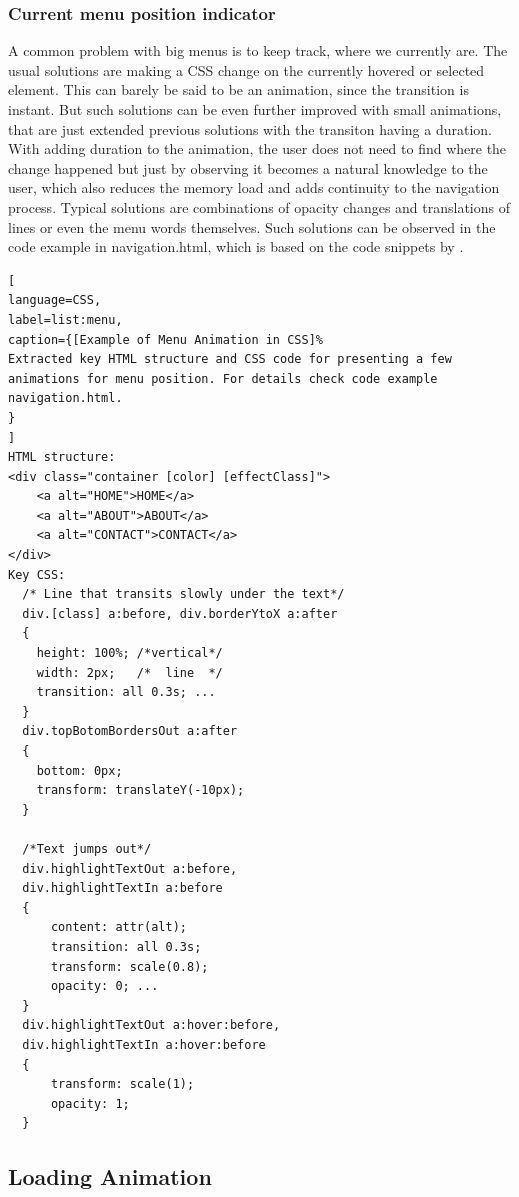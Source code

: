 \subsubsection{Current menu position indicator} %
\label{subsub:menu}

A common problem with big menus is to keep track, where we currently are. The usual solutions are making a CSS change on the currently hovered or selected element. This can barely be said to be an animation, since the transition is instant. But such solutions can be even further improved with small animations, that are just extended previous solutions with the transiton having a duration. With adding duration to the animation, the user does not need to find where the change happened but just by observing it becomes a natural knowledge to the user, which also reduces the memory load and adds continuity to the navigation process. Typical solutions are combinations of opacity changes and translations of lines or even the menu words themselves. Such solutions can be observed in the code example in navigation.html, which is based on the code snippets by \citet{menuIndex}.

\begin{lstlisting}[
language=CSS,
label=list:menu,
caption={[Example of Menu Animation in CSS]%
Extracted key HTML structure and CSS code for presenting a few animations for menu position. For details check code example navigation.html.
}
]
HTML structure:
<div class="container [color] [effectClass]">
	<a alt="HOME">HOME</a>
	<a alt="ABOUT">ABOUT</a>
	<a alt="CONTACT">CONTACT</a>
</div>
Key CSS:
  /* Line that transits slowly under the text*/
  div.[class] a:before, div.borderYtoX a:after
  {
    height: 100%; /*vertical*/
    width: 2px;   /*  line  */
    transition: all 0.3s; ...
  }
  div.topBotomBordersOut a:after
  {
    bottom: 0px;
    transform: translateY(-10px);
  }

  /*Text jumps out*/
  div.highlightTextOut a:before,
  div.highlightTextIn a:before
  {
      content: attr(alt);
      transition: all 0.3s;
      transform: scale(0.8);
      opacity: 0; ...
  } 
  div.highlightTextOut a:hover:before,
  div.highlightTextIn a:hover:before
  {
      transform: scale(1);
      opacity: 1;
  }

\end{lstlisting}


\subsection{Loading Animation} %
\label{sub:loadingCSS}

